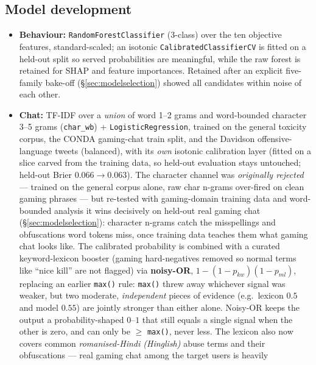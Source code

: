 \documentclass[11pt,a4paper]{article}
\begin{document}
\subsection{Model development}
\begin{itemize}[leftmargin=1.4em]
  \item \textbf{Behaviour:} \texttt{RandomForestClassifier} (3-class) over the ten
        objective features, standard-scaled; an isotonic
        \texttt{CalibratedClassifierCV} is fitted on a held-out split so served
        probabilities are meaningful, while the raw forest is retained for SHAP and
        feature importances. Retained after an explicit five-family bake-off
        (\S\ref{sec:modelselection}) showed all candidates within noise of each other.
  \item \textbf{Chat:} TF-IDF over a \emph{union} of word 1--2 grams and
        word-bounded character 3--5 grams (\texttt{char\_wb}) +
        \texttt{LogisticRegression}, trained on the general toxicity corpus, the
        CONDA gaming-chat train split, and the Davidson offensive-language tweets
        (balanced), with its \emph{own} isotonic calibration layer (fitted on a
        slice carved from the training data, so held-out evaluation stays untouched;
        held-out Brier $0.066 \rightarrow 0.063$). The character channel was \emph{originally rejected} --- trained on
        the general corpus alone, raw char n-grams over-fired on clean gaming
        phrases --- but re-tested with gaming-domain training data and word-bounded
        analysis it wins decisively on held-out real gaming chat
        (\S\ref{sec:modelselection}): character n-grams catch the misspellings and
        obfuscations word tokens miss, once training data teaches them what gaming
        chat looks like. The
        calibrated probability is combined with a curated keyword-lexicon booster
        (gaming hard-negatives removed so normal terms like ``nice kill'' are not
        flagged) via \textbf{noisy-OR}, $1-(1-p_{kw})(1-p_{ml})$, replacing an earlier
        \texttt{max()} rule: \texttt{max()} threw away whichever signal was weaker,
        but two moderate, \emph{independent} pieces of evidence (e.g.\ lexicon $0.5$
        and model $0.55$) are jointly stronger than either alone. Noisy-OR keeps the
        output a probability-shaped $0$--$1$ that still equals a single signal when
        the other is zero, and can only be $\geq$ \texttt{max()}, never less. The
        lexicon also now covers common \emph{romanised-Hindi (Hinglish)} abuse terms
        and their obfuscations --- real gaming chat among the target users is heavily

\end{itemize}
\end{document}
